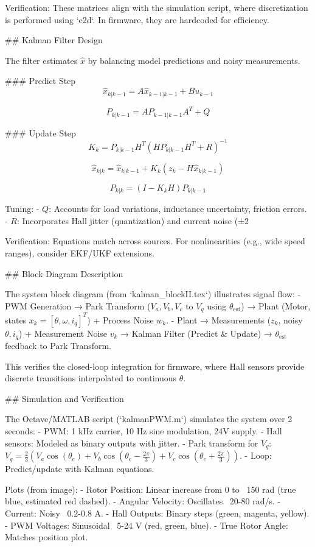 Verification: These matrices align with the simulation script, where discretization is performed using `c2d`. In firmware, they are hardcoded for efficiency.

## Kalman Filter Design

The filter estimates \( \hat{x} \) by balancing model predictions and noisy measurements.

### Predict Step
\[ \hat{x}_{k|k-1} = A \hat{x}_{k-1|k-1} + B u_{k-1} \]

\[ P_{k|k-1} = A P_{k-1|k-1} A^T + Q \]

### Update Step
\[ K_k = P_{k|k-1} H^T (H P_{k|k-1} H^T + R)^{-1} \]

\[ \hat{x}_{k|k} = \hat{x}_{k|k-1} + K_k (z_k - H \hat{x}_{k|k-1}) \]

\[ P_{k|k} = (I - K_k H) P_{k|k-1} \]

Tuning:
- \( Q \): Accounts for load variations, inductance uncertainty, friction errors.
- \( R \): Incorporates Hall jitter (quantization) and current noise (±2%

Verification: Equations match across sources. For nonlinearities (e.g., wide speed ranges), consider EKF/UKF extensions.

## Block Diagram Description

The system block diagram (from `kalman_blockII.tex`) illustrates signal flow:
- PWM Generation → Park Transform (\( V_a, V_b, V_c \) to \( V_q \) using \( \theta_{\text{est}} \)) → Plant (Motor, states \( x_k = [\theta, \omega, i_q]^T \)) + Process Noise \( w_k \).
- Plant → Measurements (\( z_k \), noisy \( \theta, i_q \)) + Measurement Noise \( v_k \) → Kalman Filter (Predict & Update) → \( \theta_{\text{est}} \) feedback to Park Transform.

This verifies the closed-loop integration for firmware, where Hall sensors provide discrete transitions interpolated to continuous \( \theta \).

## Simulation and Verification

The Octave/MATLAB script (`kalmanPWM.m`) simulates the system over 2 seconds:
- PWM: 1 kHz carrier, 10 Hz sine modulation, 24V supply.
- Hall sensors: Modeled as binary outputs with jitter.
- Park transform for \( V_q \): \( V_q = \frac{2}{3} (V_a \cos(\theta_e) + V_b \cos(\theta_e - \frac{2\pi}{3}) + V_c \cos(\theta_e + \frac{2\pi}{3})) \).
- Loop: Predict/update with Kalman equations.

Plots (from image):
- Rotor Position: Linear increase from 0 to ~150 rad (true blue, estimated red dashed).
- Angular Velocity: Oscillates ~20-80 rad/s.
- Current: Noisy ~0.2-0.8 A.
- Hall Outputs: Binary steps (green, magenta, yellow).
- PWM Voltages: Sinusoidal ~5-24 V (red, green, blue).
- True Rotor Angle: Matches position plot.

